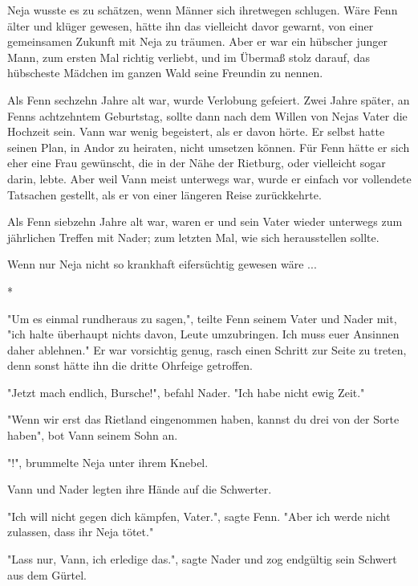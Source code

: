 \documentclass[10pt, a4paper, oneside]{book}
\begin{document}
\begin{multicols}{2}
Neja wusste es zu schätzen, wenn Männer sich ihretwegen schlugen. Wäre Fenn älter und klüger gewesen, hätte ihn das vielleicht davor gewarnt, von einer gemeinsamen Zukunft mit Neja zu träumen. Aber er war ein hübscher junger Mann, zum ersten Mal richtig verliebt, und im Übermaß stolz darauf, das hübscheste Mädchen im ganzen Wald seine Freundin zu nennen.

Als Fenn sechzehn Jahre alt war, wurde Verlobung gefeiert. Zwei Jahre später, an Fenns achtzehntem Geburtstag, sollte dann nach dem Willen von Nejas Vater die Hochzeit sein. Vann war wenig begeistert, als er davon hörte. Er selbst hatte seinen Plan, in Andor zu heiraten, nicht umsetzen können. Für Fenn hätte er sich eher eine Frau gewünscht, die in der Nähe der Rietburg, oder vielleicht sogar darin, lebte. Aber weil Vann meist unterwegs war, wurde er einfach vor vollendete Tatsachen gestellt, als er von einer längeren Reise zurückkehrte. 

Als Fenn siebzehn Jahre alt war, waren er und sein Vater wieder unterwegs zum jährlichen Treffen mit Nader; zum letzten Mal, wie sich herausstellen sollte.

Wenn nur Neja nicht so krankhaft eifersüchtig gewesen wäre ...

\begin{center}
    *
\end{center}

"Um es einmal rundheraus zu sagen,", teilte Fenn seinem Vater und Nader mit, "ich halte überhaupt nichts davon, Leute umzubringen. Ich muss euer Ansinnen daher ablehnen." Er war vorsichtig genug, rasch einen Schritt zur Seite zu treten, denn sonst hätte ihn die dritte Ohrfeige getroffen.

"Jetzt mach endlich, Bursche!", befahl Nader. "Ich habe nicht ewig Zeit."

"Wenn wir erst das Rietland eingenommen haben, kannst du drei von der Sorte haben", bot Vann seinem Sohn an.

"!", brummelte Neja unter ihrem Knebel.

Vann und Nader legten ihre Hände auf die Schwerter.

"Ich will nicht gegen dich kämpfen, Vater.", sagte Fenn. "Aber ich werde nicht zulassen, dass ihr Neja tötet."

"Lass nur, Vann, ich erledige das.", sagte Nader und zog endgültig sein Schwert aus dem Gürtel.


\end{multicols}
\end{document}
